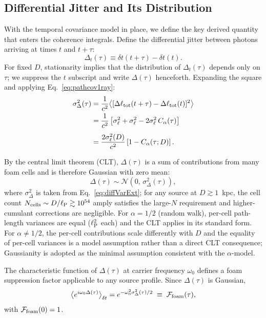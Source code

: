 \documentclass[aps,prd,onecolumn,amsmath,amssymb]{revtex4-2}
\begin{document}
\subsection{Differential Jitter and Its Distribution}
\label{sec:differential_jitter}

With the temporal covariance model in place, we define the key derived quantity
that enters the coherence integrals.
Define the differential jitter between photons arriving at
times $t$ and $t+\tau$:
\begin{equation}
  \Delta_t(\tau)
  \equiv \delta t(t+\tau) - \delta t(t).
  \label{eq:DeltaExt}
\end{equation}
For fixed $D$, stationarity implies that the distribution of
$\Delta_t(\tau)$ depends only on $\tau$; we suppress the $t$
subscript and write $\Delta(\tau)$ henceforth.
Expanding the square and applying Eq.~\eqref{eq:pathcov1ray}:
\begin{align}
  \sigma_\Delta^2(\tau)
  &= \frac{1}{c^2}\big\langle
    [\Delta\ell_{\rm tot}(t+\tau)
     - \Delta\ell_{\rm tot}(t)]^2
    \big\rangle \notag \\
  &= \frac{1}{c^2}\left[
    \sigma_\ell^2 + \sigma_\ell^2
    - 2\sigma_\ell^2\,C_\alpha(\tau)
    \right] \notag \\[4pt]
  &= \frac{2\sigma_\ell^2(D)}{c^2}
    \left[1 - C_\alpha(\tau;D)\right].
  \label{eq:diffVarExt}
\end{align}

By the central limit theorem (CLT), $\Delta(\tau)$
is a sum of contributions from many foam cells and is therefore Gaussian with zero mean:
\begin{equation}
  \Delta(\tau)
  \sim \mathcal{N}\!\left(0,\,\sigma_\Delta^2(\tau)\right),
  \label{eq:kernel}
\end{equation}
where $\sigma_\Delta^2$ is taken from Eq.~\eqref{eq:diffVarExt}; for
any source at $D \gtrsim 1$~kpc, the cell count
$N_{\rm cells} \sim D/\ell_{\rm P} \gtrsim 10^{54}$ amply satisfies
the large-$N$ requirement and higher-cumulant corrections are negligible.  For $\alpha = 1/2$ (random walk), per-cell path-length variances
are equal ($\ell_{\rm P}^2$ each) and the CLT applies in its standard form.
For $\alpha \neq 1/2$, the per-cell contributions scale differently with $D$
and the equality of per-cell variances is a model assumption rather than a
direct CLT consequence; Gaussianity is adopted as the minimal assumption
consistent with the $\alpha$-model.

The characteristic function of $\Delta(\tau)$ at carrier frequency
$\omega_0$ defines a foam suppression factor applicable to any source
profile.  Since $\Delta(\tau)$ is Gaussian,
\begin{equation}
  \big\langle e^{i\omega_0\Delta(\tau)}\big\rangle_{\delta t}
  = e^{-\omega_0^2\sigma_\Delta^2(\tau)/2}
  \;\equiv\; \mathcal{F}_{\rm foam}(\tau),
  \label{eq:gaussian_jitter}
\end{equation}
with $\mathcal{F}_{\rm foam}(0) = 1$.
\end{document}
